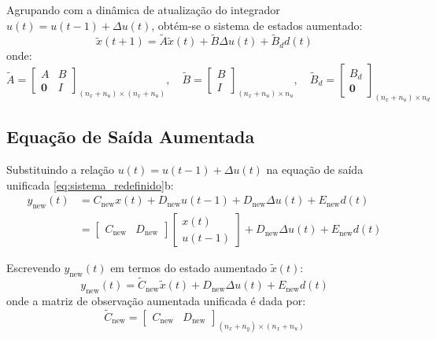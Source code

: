 \documentclass[12pt]{article}
\begin{document}
Agrupando com a dinâmica de atualização do integrador $u(t) = u(t-1) + \Delta u(t)$, obtém-se o sistema de estados aumentado:
\begin{equation}
\label{eq:estado_aumentado_atualizado}
\tilde{x}(t+1) = \tilde{A} \tilde{x}(t) + \tilde{B} \Delta u(t) + \tilde{B}_d d(t)
\end{equation}
onde:
\begin{equation}
\tilde{A} = \begin{bmatrix} A & B \\ \bm{0} & I \end{bmatrix}_{(n_x+n_u) \times (n_x+n_u)}, \quad
\tilde{B} = \begin{bmatrix} B \\ I \end{bmatrix}_{(n_x+n_u) \times n_u}, \quad
\tilde{B}_d = \begin{bmatrix} B_d \\ \bm{0} \end{bmatrix}_{(n_x+n_u) \times n_d}
\end{equation}

\subsection{Equação de Saída Aumentada}
Substituindo a relação $u(t) = u(t-1) + \Delta u(t)$ na equação de saída unificada \eqref{eq:sistema_redefinido}b:
\begin{align}
y_{\text{new}}(t) &= C_{\text{new}} x(t) + D_{\text{new}} u(t-1) + D_{\text{new}} \Delta u(t) + E_{\text{new}} d(t) \nonumber \\
                  &= \begin{bmatrix} C_{\text{new}} & D_{\text{new}} \end{bmatrix} \begin{bmatrix} x(t) \\ u(t-1) \end{bmatrix} + D_{\text{new}} \Delta u(t) + E_{\text{new}} d(t)
\end{align}

Escrevendo $y_{\text{new}}(t)$ em termos do estado aumentado $\tilde{x}(t)$:
\begin{equation}
\label{eq:saida_aumentada_unificada}
y_{\text{new}}(t) = \tilde{C}_{\text{new}} \tilde{x}(t) + D_{\text{new}} \Delta u(t) + E_{\text{new}} d(t)
\end{equation}
onde a matriz de observação aumentada unificada é dada por:
\begin{equation}
\tilde{C}_{\text{new}} = \begin{bmatrix} C_{\text{new}} & D_{\text{new}} \end{bmatrix}_{(n_x+n_y) \times (n_x+n_u)}
\end{equation}
\end{document}
